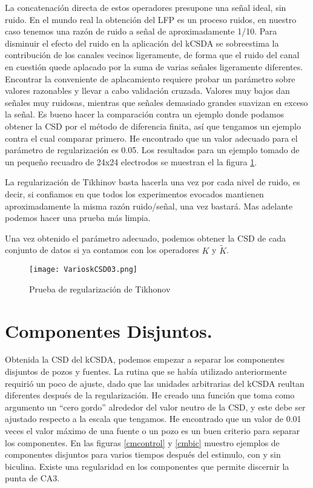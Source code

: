 \documentclass{article}
\begin{document}
La concatenación directa de estos operadores presupone una señal ideal, sin ruido.
En el mundo real la obtención del LFP es un proceso ruidos, en nuestro caso
tenemos una razón de ruido a señal de aproximadamente 1/10.  Para disminuir el efecto
del ruido en la aplicación del kCSDA se sobreestima la contribución de los canales
vecinos ligeramente, de forma que el ruido del canal en cuestión quede
aplacado por la suma de varias señales ligeramente diferentes. Encontrar
la conveniente de aplacamiento requiere probar un parámetro sobre valores
razonables y llevar a cabo validación cruzada.
Valores muy bajos dan señales muy ruidosas, mientras que señales demasiado grandes
suavizan en exceso la señal.
Es bueno hacer la comparación contra un ejemplo donde podamos obtener la CSD
por el método de diferencia finita, así que tengamos un ejemplo contra
el cual comparar primero. He encontrado que un valor adecuado para el
parámetro de regularización es 0.05. Los resultados para un ejemplo
tomado de un pequeño recuadro de 24x24 electrodos se
muestran el la figura \ref{regultik}.

La regularización de Tikhinov basta hacerla una vez por cada nivel de
ruido, es decir, si confiamos en que todos los experimentos evocados
mantienen aproximadamente la misma razón ruido/señal, una vez
bastará. Mas adelante podemos hacer una prueba más limpia.

Una vez obtenido el parámetro adecuado, podemos obtener la CSD
de cada conjunto de datos si ya contamos con los operadores
$K$ y $\tilde{K}$.

\begin{figure}[h]
  \texttt{[image: VarioskCSD03.png]}
  \caption{Prueba de regularización de Tikhonov}\label{regultik}
\end{figure}


\section{Componentes Disjuntos.}

Obtenida la CSD del kCSDA, podemos empezar a separar los componentes disjuntos
de pozos y fuentes. La rutina que se había utilizado anteriormente requirió
un poco de ajuste, dado que las unidades arbitrarias del kCSDA reultan diferentes
después de la regularización. He creado una función que toma como argumento
un ``cero gordo'' alrededor del valor neutro de la CSD, y este debe
ser ajustado respecto a la escala que tengamos. He encontrado que un valor
de 0.01 veces el valor máximo de una fuente o un pozo es un buen criterio
para separar los componentes. En las figuras \ref{cmcontrol} y \ref{cmbic}
muestro
ejemplos de componentes disjuntos para varios tiempos después del estimulo,
con y sin biculina. Existe una regularidad en los componentes que permite
discernir la punta de CA3. 
\end{document}
